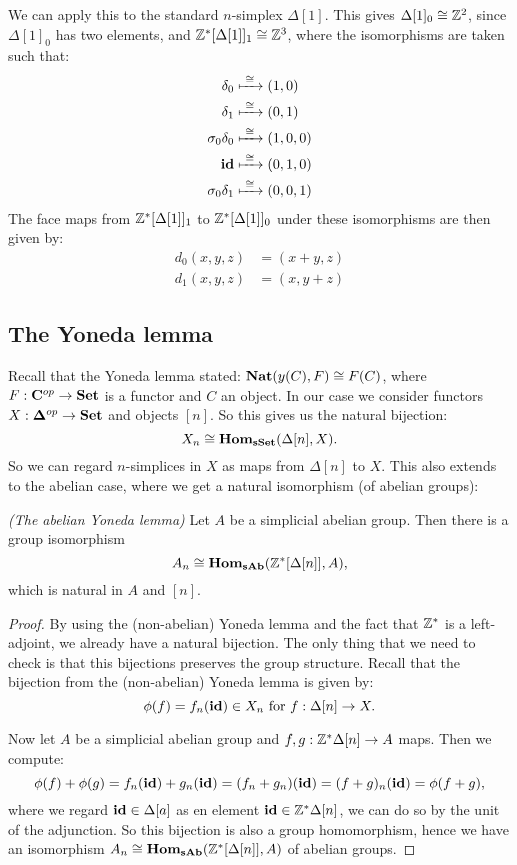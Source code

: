 \begin{example}
	We can apply this to the standard $n$-simplex $\Delta[1]$. This gives $\Delta[1]_0 \cong \mathbb{Z}^2$, since $\Delta[1]_0$ has two elements, and $\mathbb{Z}^\ast[\Delta[1]]_1 \cong \mathbb{Z}^3$, where the isomorphisms are taken such that:
	\begin{align*}
		\delta_0         &\xmapsto{\,\,{\cong}\,\,} (1, 0) \\
		\delta_1         &\xmapsto{\,\,{\cong}\,\,} (0, 1) \\
		\sigma_0\delta_0 &\xmapsto{\,\,{\cong}\,\,} (1, 0, 0) \\
		\mathbf{id}              &\xmapsto{\,\,{\cong}\,\,} (0, 1, 0) \\
		\sigma_0\delta_1 &\xmapsto{\,\,{\cong}\,\,} (0, 0, 1)
	\end{align*}
	The face maps from $\mathbb{Z}^\ast[\Delta[1]]_1$ to $\mathbb{Z}^\ast[\Delta[1]]_0$ under these isomorphisms are then given by:
	\begin{align*}
		d_0(x, y, z) &= (x+y, z) \\
		d_1(x, y, z) &= (x, y+z)
	\end{align*}
\end{example}

\subsection{The Yoneda lemma}
Recall that the Yoneda lemma stated: $\mathbf{Nat}(y(C), F) \cong F(C)$, where $F:\mathbf{C}^{op} \to \mathbf{Set}$ is a functor and $C$ an object. In our case we consider functors $X: \mathbf{\Delta}^{op} \to \mathbf{Set}$ and objects $[n]$. So this gives us the natural bijection:
$$ X_n \cong \mathbf{Hom}_{\mathbf{sSet}}(\Delta[n], X). $$
So we can regard $n$-simplices in $X$ as maps from $\Delta[n]$ to $X$. This also extends to the abelian case, where we get a natural isomorphism (of abelian groups):
\begin{lemma}\emph{(The abelian Yoneda lemma)}
	Let $A$ be a simplicial abelian group. Then there is a group isomorphism
	$$ A_n \cong \mathbf{Hom}_{\mathbf{sAb}}(\mathbb{Z}^\ast[\Delta[n]], A), $$
	which is natural in $A$ and $[n]$.
\end{lemma}
\begin{proof}
	By using the (non-abelian) Yoneda lemma and the fact that $\mathbb{Z}^\ast$ is a left-adjoint, we already have a natural bijection. The only thing that we need to check is that this bijections preserves the group structure. Recall that the bijection from the (non-abelian) Yoneda lemma is given by:
	$$ \phi(f) = f_n(\mathbf{id}) \in X_n \text{ for } f: \Delta[n] \to X. $$

	Now let $A$ be a simplicial abelian group and $f, g: \mathbb{Z}^\ast\Delta[n] \to A$ maps. Then we compute:
	$$ \phi(f) + \phi(g) = f_n(\mathbf{id}) + g_n(\mathbf{id}) = (f_n + g_n)(\mathbf{id}) = (f+g)_n(\mathbf{id}) = \phi(f+g), $$
	where we regard $\mathbf{id} \in \Delta[a]$ as en element $\mathbf{id} \in \mathbb{Z}^\ast\Delta[n]$, we can do so by the unit of the adjunction. So this bijection is also a group homomorphism, hence we have an isomorphism $A_n \cong \mathbf{Hom}_{\mathbf{sAb}}(\mathbb{Z}^\ast[\Delta[n]], A)$ of abelian groups.
\end{proof}
